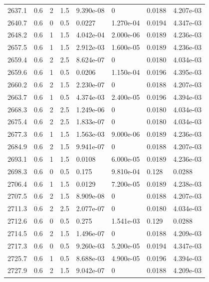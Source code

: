\documentclass[preview]{standalone}
\begin{document}
{{{{{{{{{\begin{tabular}{L{1.2cm}C{1.2cm} C{0.3cm}C{0.5cm} C{1.4cm}C{1.4cm} C{1.4cm}C{1.4cm}}
  2637.1  &   0.6  & 2     & 1.5 &  9.390e-08  & 0  & 0.0188 &  4.207e-03   \\ 
  2640.7  &   0.6  & 0     & 0.5 &  0.0227  & 1.270e-04  & 0.0194 &  4.347e-03   \\ 
  2648.2  &   0.6  & 1     & 1.5 &  4.042e-04  & 2.000e-06  & 0.0189 &  4.236e-03   \\ 
  2657.5  &   0.6  & 1     & 1.5 &  2.912e-03  & 1.600e-05  & 0.0189 &  4.236e-03   \\ 
  2659.4  &   0.6  & 2     & 2.5 &  8.624e-07  & 0  & 0.0180 &  4.034e-03   \\ 
  2659.6  &   0.6  & 1     & 0.5 &  0.0206  & 1.150e-04  & 0.0196 &  4.395e-03   \\ 
  2660.2  &   0.6  & 2     & 1.5 &  2.230e-07  & 0  & 0.0188 &  4.207e-03   \\ 
  2663.7  &   0.6  & 1     & 0.5 &  4.374e-03  & 2.400e-05  & 0.0196 &  4.394e-03   \\ 
  2668.3  &   0.6  & 2     & 2.5 &  1.249e-06  & 0  & 0.0180 &  4.034e-03   \\ 
  2675.4  &   0.6  & 2     & 2.5 &  1.833e-07  & 0  & 0.0180 &  4.034e-03   \\ 
  2677.3  &   0.6  & 1     & 1.5 &  1.563e-03  & 9.000e-06  & 0.0189 &  4.236e-03   \\ 
  2684.9  &   0.6  & 2     & 1.5 &  9.941e-07  & 0  & 0.0188 &  4.207e-03   \\ 
  2693.1  &   0.6  & 1     & 1.5 &  0.0108  & 6.000e-05  & 0.0189 &  4.236e-03   \\ 
  2698.3  &   0.6  & 0     & 0.5 &  0.175  & 9.810e-04  & 0.128 &  0.0288   \\ 
  2706.4  &   0.6  & 1     & 1.5 &  0.0129  & 7.200e-05  & 0.0189 &  4.238e-03   \\ 
  2707.5  &   0.6  & 2     & 1.5 &  8.909e-08  & 0  & 0.0188 &  4.207e-03   \\ 
  2711.3  &   0.6  & 2     & 2.5 &  2.077e-07  & 0  & 0.0180 &  4.034e-03   \\ 
  2712.6  &   0.6  & 0     & 0.5 &  0.275  & 1.541e-03  & 0.129 &  0.0288   \\ 
  2714.5  &   0.6  & 2     & 1.5 &  1.496e-07  & 0  & 0.0188 &  4.209e-03   \\ 
  2717.3  &   0.6  & 0     & 0.5 &  9.260e-03  & 5.200e-05  & 0.0194 &  4.347e-03   \\ 
  2725.7  &   0.6  & 1     & 0.5 &  8.688e-03  & 4.900e-05  & 0.0196 &  4.394e-03   \\ 
  2727.9  &   0.6  & 2     & 1.5 &  9.042e-07  & 0  & 0.0188 &  4.209e-03   \\ 

\end{tabular}}}}}}}}}}
\end{document}
